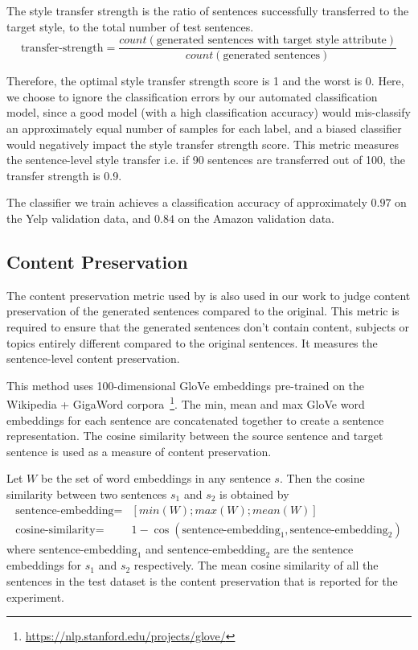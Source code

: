 The style transfer strength is the ratio of sentences successfully transferred to the target style, to the total number of test sentences.
\begin{equation*}
	\text{transfer-strength} = \frac{count(\text{generated sentences with target style attribute})}{count(\text{generated sentences})}
\end{equation*}

Therefore, the optimal style transfer strength score is 1 and the worst is 0. Here, we choose to ignore the classification errors by our automated classification model, since a good model (with a high classification accuracy) would mis-classify an approximately equal number of samples for each label, and a biased classifier would negatively impact the style transfer strength score. This metric measures the sentence-level style transfer i.e. if 90 sentences are transferred out of 100, the transfer strength is 0.9.

The classifier we train achieves a classification accuracy of approximately $0.97$ on the Yelp validation data, and $0.84$ on the Amazon validation data.

\subsection{Content Preservation} \label{ssec:content-preservation-metric}

The content preservation metric used by \cite{fu2017style} is also used in our work to judge content preservation of the generated sentences compared to the original. This metric is required to ensure that the generated sentences don't contain content, subjects or topics entirely different compared to the original sentences. It measures the sentence-level content preservation.

This method uses 100-dimensional GloVe embeddings \citep{pennington2014glove} pre-trained on the Wikipedia + GigaWord corpora~\footnote{\url{https://nlp.stanford.edu/projects/glove/}}. The min, mean and max GloVe word embeddings for each sentence are concatenated together to create a sentence representation. The cosine similarity between the source sentence and target sentence is used as a measure of content preservation.

Let $W$ be the set of word embeddings in any sentence $s$. Then the cosine similarity between two sentences $s_1$ and $s_2$ is obtained by
\begin{align*}
	\text{sentence-embedding} =
	 & [min(W);max(W);mean(W)]                                            \\
	\text{cosine-similarity} =
	 & 1 - \cos(\text{sentence-embedding}_1, \text{sentence-embedding}_2)
\end{align*}
where $\text{sentence-embedding}_1$ and $\text{sentence-embedding}_2$ are the sentence embeddings for $s_1$ and $s_2$ respectively. The mean cosine similarity of all the sentences in the test dataset is the content preservation that is reported for the experiment.


